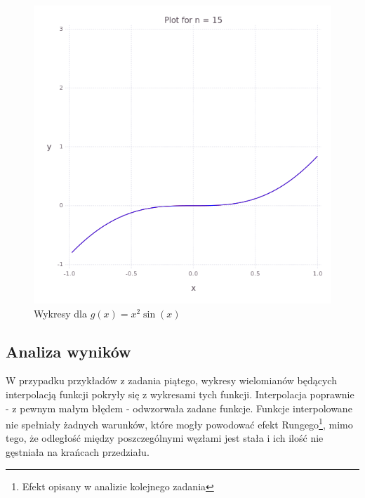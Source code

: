 \begin{figure}
\begin{multicols}{2}
    \end{multicols}
    \begin{multicols}{2}
        \includegraphics[width=\linewidth]{../task-5/plots/myplot-x2sinx-15.png}\par
    \end{multicols}
    \caption{Wykresy dla $g(x) = x^2 \sin(x)$}    
\end{figure}
\subsection{Analiza wyników}
W przypadku przykładów z zadania piątego, wykresy wielomianów będących interpolacją funkcji pokryły się z wykresami tych funkcji. Interpolacja poprawnie - z pewnym małym błędem - odwzorwała zadane funkcje. Funkcje interpolowane nie spełniały żadnych warunków, które mogły powodować efekt Rungego\footnote{Efekt opisany w analizie kolejnego zadania}, mimo tego, że odległość między poszczególnymi węzłami jest stała i ich ilość nie gęstniała na krańcach przedziału.
